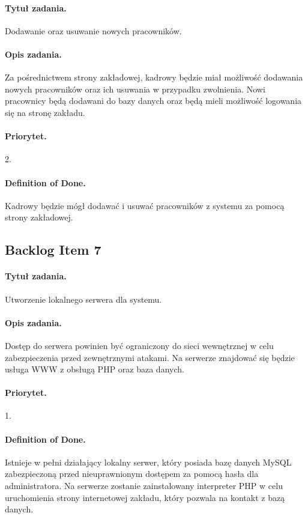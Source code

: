 \documentclass[a4paper]{article}
\begin{document}
\paragraph{Tytuł zadania.} Dodawanie oraz usuwanie nowych pracowników.
\paragraph{Opis zadania.} Za pośrednictwem strony zakładowej, kadrowy będzie miał możliwość dodawania nowych pracowników oraz ich usuwania w przypadku zwolnienia. Nowi pracownicy będą dodawani do bazy danych oraz będą mieli możliwość logowania się na stronę zakładu.
\paragraph{Priorytet.} 2.
\paragraph{Definition of Done.} Kadrowy będzie mógł dodawać i usuwać pracowników z systemu za pomocą strony zakładowej.

\subsection{Backlog Item 7}
\paragraph{Tytuł zadania.} Utworzenie lokalnego serwera dla systemu.
\paragraph{Opis zadania.} Dostęp do serwera powinien być ograniczony do sieci wewnętrznej w celu zabezpieczenia przed zewnętrznymi atakami. Na serwerze znajdować się będzie usługa WWW z obsługą PHP oraz baza danych.
\paragraph{Priorytet.} 1.
\paragraph{Definition of Done.} Istnieje w pełni działający lokalny serwer, który posiada bazę danych MySQL zabezpieczoną przed nieuprawnionym dostępem za pomocą hasła dla administratora. Na serwerze zostanie zainstalowany interpreter PHP w celu uruchomienia strony internetowej zakładu, który pozwala na kontakt z bazą danych.
\end{document}
